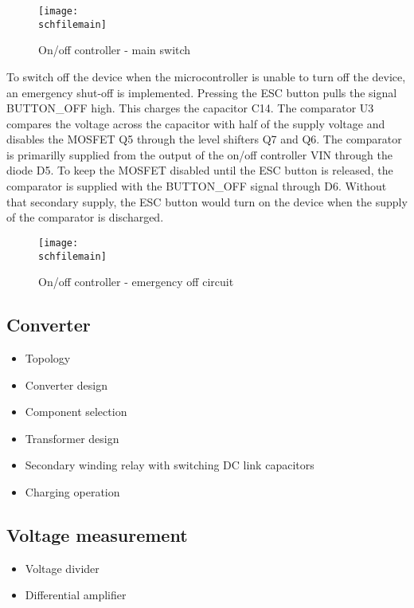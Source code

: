 \begin{figure}[h!]
    \centering
    \texttt{[image: \\schfilemain]}
    \caption{On/off controller - main switch}
    \label{fig_onoff_switch}
\end{figure}

To switch off the device when the microcontroller is unable to turn off the device, an emergency shut-off is implemented. Pressing the ESC button pulls the signal BUTTON\_OFF high. This charges the capacitor C14. The comparator U3 compares the voltage across the capacitor with half of the supply voltage and disables the \ac{MOSFET} Q5 through the level shifters Q7 and Q6. The comparator is primarilly supplied from the output of the on/off controller VIN through the diode D5. To keep the \ac{MOSFET} disabled until the ESC button is released, the comparator is supplied with the BUTTON\_OFF signal through D6. Without that secondary supply, the ESC button would turn on the device when the supply of the comparator is discharged. 

\begin{figure}[h!]
    \centering
    \texttt{[image: \\schfilemain]}
    \caption{On/off controller - emergency off circuit}
    \label{fig_onoff_emergency_off}
\end{figure}

\FloatBarrier

\subsection{Converter}
\label{sec_converter}
\begin{itemize}
    \item Topology
    \item Converter design
    \item Component selection
    \item Transformer design
    \item Secondary winding relay with switching DC link capacitors
    \item Charging operation
\end{itemize}

\FloatBarrier

\subsection{Voltage measurement}
\label{sec_volt_meas}
\begin{itemize}
    \item Voltage divider
    \item Differential amplifier
\end{itemize}


